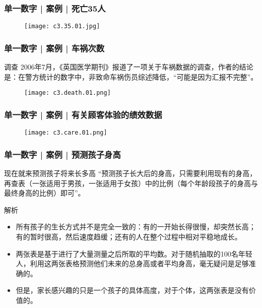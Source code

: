\begin{frame}
  \frametitle{单一数字 | 案例 | 死亡35人}
  \begin{figure}
    \centering
    \texttt{[image: c3.35.01.jpg]}
  \end{figure}
\end{frame}

\begin{frame}
  \frametitle{单一数字 | 案例 | 车祸次数}
  \begin{block}{调查}
    2006年7月，《英国医学期刊》报道了一项关于车祸数据的调查，作者的结论是：在警方统计的数字中，非致命车祸伤员综述降低，“可能是因为汇报不完整”。
  \end{block}
  \begin{figure}
    \centering
    \texttt{[image: c3.death.01.png]}
  \end{figure}
\end{frame}

\begin{frame}
  \frametitle{单一数字 | 案例 | 有关顾客体验的绩效数据}
  \begin{figure}
    \centering
    \texttt{[image: c3.care.01.png]}
  \end{figure}
\end{frame}

\begin{frame}
  \frametitle{单一数字 | 案例 | 预测孩子身高}
  \begin{block}{现在就来预测孩子将来长多高}
    “预测孩子长大后的身高，只需要利用现有的身高，再查表（一张适用于男孩，一张适用于女孩）中的比例（每个年龄段孩子的身高与最终身高的比例）即可”。
  \end{block}
  \pause
  \begin{block}{解析}
    \begin{itemize}
      \item 所有孩子的生长方式并不是完全一致的：有的一开始长得很慢，却突然长高；有的暂时很高，然后速度趋缓；还有的人在整个过程中相对平稳地成长。
      \item 两张表是基于进行了大量测量之后所取的平均数。对于随机抽取的100名年轻人，利用这两张表格预测他们未来的总身高或者平均身高，毫无疑问是足够准确的。
      \item 但是，家长感兴趣的只是一个孩子的具体高度，对于个体，这两张表是没有价值的。
    \end{itemize}
  \end{block}
\end{frame}

